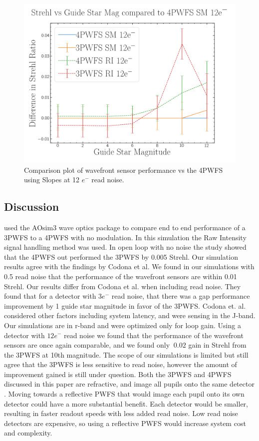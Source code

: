 \begin{figure}[h]
    \centering
    \includegraphics[width=.7\linewidth]{Chapter Materials/Chapter Four Materials/StrehlvGuideStarvs4PWFSRM12e.png}
    \caption{Comparison plot of wavefront sensor performance vs the 4PWFS using Slopes at 12 $e^-$ read noise.}
    \label{fig:12RN}
\end{figure}

\subsection{Discussion}


\cite{codona2018comparative} used the AOsim3 wave optics package to compare end to end performance of a 3PWFS to a 4PWFS with no modulation. In this simulation the Raw Intensity  signal handling method was used. In open loop with no noise the study showed that the 4PWFS out performed the 3PWFS by 0.005 Strehl. Our simulation results agree with the findings by Codona et al. We found in our simulations with 0.5 read noise that the performance of the wavefront sensors are within 0.01 Strehl. Our results differ from Codona et al. when including read noise. They found that for a detector with $3e^-$ read noise, that there was a gap performance improvement by 1 guide star magnitude in favor of the 3PWFS. Codona et. al. considered other factors including system latency, and were sensing in the J-band. Our simulations are in r-band and were optimized only for loop gain. Using a detector with $12 e^-$ read noise we found that the performance of the wavefront sensors are once again comparable, and we found only $~0.02$ gain in Strehl from the 3PWFS at 10th magnitude. The scope of our simulations is limited but still agree that the 3PWFS is less sensitive to read noise, however the amount of improvement gained is still under question. Both the 3PWFS and 4PWFS discussed in this paper are refractive, and image all pupils onto the same detector \citep{sanchez2020design}. Moving towards a reflective PWFS that would image each pupil onto its own detector could have a more substantial benefit. Each detector would be smaller, resulting in faster readout speeds with less added read noise. Low read noise detectors are expensive, so using a reflective PWFS would increase system cost and complexity.

\newpage